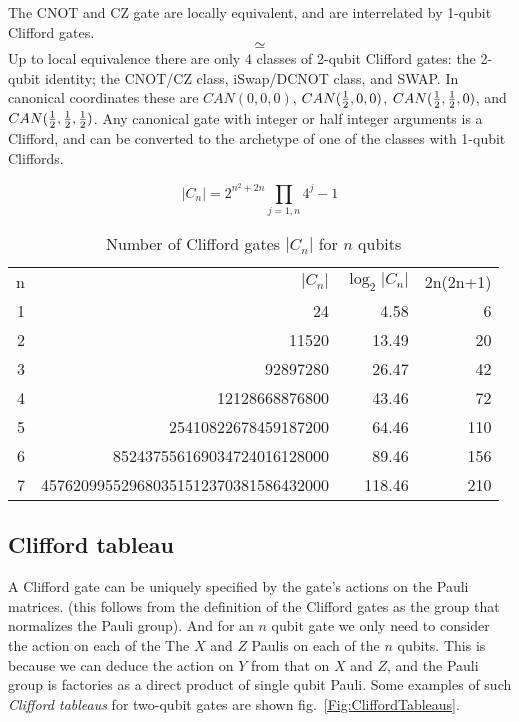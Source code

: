 The CNOT and CZ gate are locally equivalent, and are interrelated by 1-qubit Clifford gates. 
$$

\simeq

$$
Up to local equivalence there are only 4 classes of 2-qubit Clifford gates: the 2-qubit identity; the CNOT/CZ class, iSwap/DCNOT class, and SWAP. In canonical coordinates these are $CAN(0,0,0)$, $CAN(\half,0,0)$, $CAN(\half,\half,0)$, and $CAN(\half,\half,\half)$.  Any canonical gate with integer or half integer arguments is a Clifford, and can be converted to the archetype of one of the classes with 1-qubit Cliffords.  




\begin{table*}[tp]
\caption{Number of Clifford gates $|C_n|$ for $n$ qubits \cite{???}}
\label{Fig:CliffordNumbers}
$$|C_n| = 2^{n^2+2n} \prod_{j=1,n} 4^j-1$$
\begin{center}
\begin{tabular}{rrrr}
n &  $|C_n|$ & $\log_2 |C_n|$ & 2n(2n+1) \\
1 & 24 & 4.58 & 6 \\
2 & 11520 & 13.49 & 20 \\
3 & 92897280 & 26.47 & 42 \\
4 & 12128668876800 & 43.46 & 72 \\
5 & 25410822678459187200 & 64.46 & 110 \\
6 & 852437556169034724016128000 & 89.46 & 156 \\
7 & 457620995529680351512370381586432000 & 118.46 & 210 \\
\end{tabular}
\end{center}
\end{table*}



\subsection{Clifford tableau}

A Clifford gate can be uniquely specified by the gate's actions on the Pauli matrices. (this follows from the definition of the Clifford gates as the group that normalizes the Pauli group). And for an $n$ qubit gate we only need to consider the action on each of the The $X$ and $Z$ Paulis on each of the $n$ qubits. This is because we can deduce the action on $Y$ from that on $X$ and $Z$, and the Pauli group is factories as a direct product of single qubit Pauli. Some examples of such  {\sl Clifford tableaus} for two-qubit gates are shown fig.~\ref{Fig:CliffordTableaus}. 

